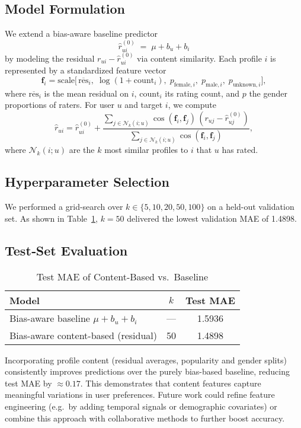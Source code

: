 \subsection*{Model Formulation}
We extend a bias-aware baseline predictor 
\[
  \hat r_{ui}^{(0)} \;=\; \mu + b_u + b_i
\]
by modeling the residual \(r_{ui} - \hat r_{ui}^{(0)}\) via content similarity.  Each profile \(i\) is represented by a standardized feature vector 
\[
  \mathbf{f}_i = \mathrm{scale}\bigl[\,
    \overline{\mathrm{res}}_i,\;
    \log(1 + \mathrm{count}_i),\;
    p_{\mathrm{female},i},\;
    p_{\mathrm{male},i},\;
    p_{\mathrm{unknown},i}
  \bigr],
\]
where \(\overline{\mathrm{res}}_i\) is the mean residual on \(i\), \(\mathrm{count}_i\) its rating count, and \(p\) the gender proportions of raters.  For user \(u\) and target \(i\), we compute
\[
  \hat r_{ui}
  = \hat r_{ui}^{(0)}
  + \frac{\sum_{j\in\mathcal N_k(i;u)} 
               \cos(\mathbf f_i,\mathbf f_j)\,(r_{uj} - \hat r_{uj}^{(0)})}
         {\sum_{j\in\mathcal N_k(i;u)} \cos(\mathbf f_i,\mathbf f_j)},
\]
where \(\mathcal N_k(i;u)\) are the \(k\) most similar profiles to \(i\) that \(u\) has rated.

\subsection*{Hyperparameter Selection}
We performed a grid-search over \(k\in\{5,10,20,50,100\}\) on a held-out validation set.  As shown in Table~\ref{tab:cbf}, \(k=50\) delivered the lowest validation MAE of 1.4898.

\subsection*{Test‐Set Evaluation}
\begin{table}[H]
  \centering
  \caption{Test MAE of Content-Based vs.\ Baseline}
  \label{tab:cbf}
  \begin{tabular}{@{}lcc@{}}
    \toprule
    Model                            & \(k\) & Test MAE \\ 
    \midrule
    Bias-aware baseline \(\mu+b_u+b_i\)     & —     & 1.5936   \\
    Bias-aware content-based (residual)     & 50    & 1.4898   \\
    
    \bottomrule
  \end{tabular}
\end{table}

Incorporating profile content (residual averages, popularity and gender splits) consistently improves predictions over the purely bias-based baseline, reducing test MAE by \(\approx\!0.17\).  This demonstrates that content features capture meaningful variations in user preferences.  Future work could refine feature engineering (e.g.\ by adding temporal signals or demographic covariates) or combine this approach with collaborative methods to further boost accuracy.